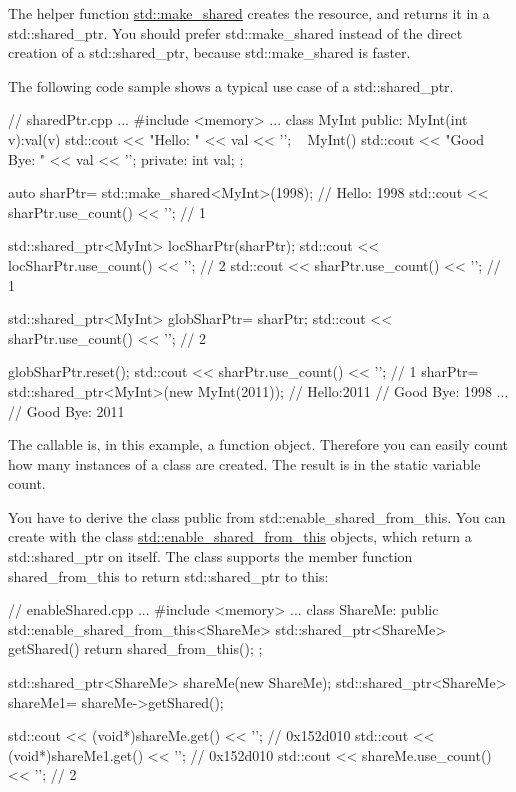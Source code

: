 
The helper function \href{http://en.cppreference.com/w/cpp/memory/shared_ptr/make_shared}{std::make\_shared} creates the resource, and returns it in a std::shared\_ptr. You should prefer std::make\_shared instead of the direct creation of a std::shared\_ptr, because std::make\_shared is faster.

The following code sample shows a typical use case of a std::shared\_ptr.


\begin{cpp}
// sharedPtr.cpp
...
#include <memory>
...
class MyInt{
public:
	MyInt(int v):val(v){
		std::cout << "Hello: " << val << '\n';
	} ~
	MyInt(){
		std::cout << "Good Bye: " << val << '\n';
	}
private:
	int val;
};

auto sharPtr= std::make_shared<MyInt>(1998); // Hello: 1998
std::cout << sharPtr.use_count() << '\n'; // 1

{
	std::shared_ptr<MyInt> locSharPtr(sharPtr);
	std::cout << locSharPtr.use_count() << '\n'; // 2
}
std::cout << sharPtr.use_count() << '\n'; // 1

std::shared_ptr<MyInt> globSharPtr= sharPtr;
std::cout << sharPtr.use_count() << '\n'; // 2

globSharPtr.reset();
std::cout << sharPtr.use_count() << '\n'; // 1
sharPtr= std::shared_ptr<MyInt>(new MyInt(2011)); // Hello:2011
												  // Good Bye: 1998
...
// Good Bye: 2011
\end{cpp}

The callable is, in this example, a function object. Therefore you can easily count how many instances of a class are created. The result is in the static variable count.


You have to derive the class public from std::enable\_shared\_from\_this. You can create with the class \href{http://en.cppreference.com/w/cpp/memory/enable_shared_from_this}{std::enable\_shared\_from\_this} objects, which return a std::shared\_ptr on itself. The class supports the member function shared\_from\_this to return std::shared\_ptr to this:


\begin{cpp}
// enableShared.cpp
...
#include <memory>
...
class ShareMe: public std::enable_shared_from_this<ShareMe>{
	std::shared_ptr<ShareMe> getShared(){
		return shared_from_this();
	}
};

std::shared_ptr<ShareMe> shareMe(new ShareMe);
std::shared_ptr<ShareMe> shareMe1= shareMe->getShared();

std::cout << (void*)shareMe.get() << '\n'; // 0x152d010
std::cout << (void*)shareMe1.get() << '\n'; // 0x152d010
std::cout << shareMe.use_count() << '\n'; // 2
\end{cpp}

